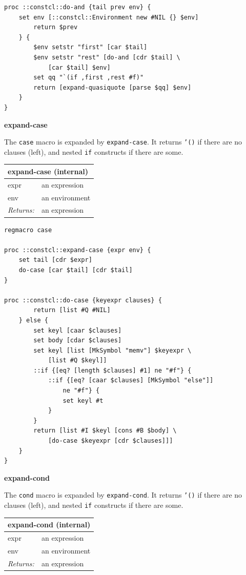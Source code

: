 \documentclass[twoside,9pt]{report}
\begin{document}
\noindent\makebox[\linewidth]{\rule{\linewidth}{0.4pt}}
\begin{lstlisting}
proc ::constcl::do-and {tail prev env} {
    set env [::constcl::Environment new #NIL {} $env]
        return $prev
    } {
        $env setstr "first" [car $tail]
        $env setstr "rest" [do-and [cdr $tail] \
            [car $tail] $env]
        set qq "`(if ,first ,rest #f)"
        return [expand-quasiquote [parse $qq] $env]
    }
}
\end{lstlisting}
\noindent\makebox[\linewidth]{\rule{\linewidth}{0.4pt}}

\textbf{expand-case}


The \texttt{case} macro is expanded by \texttt{expand-case}. It returns \texttt{'()} if there are no clauses (left), and nested \texttt{if} constructs if there are some.

\begin{tabular}{ |l l| }
\hline
\multicolumn{2}{|l|}{expand-case (internal)} \\
\hline
expr & an expression \\
env & an environment \\
\textit{Returns:} & an expression \\
\hline
\end{tabular}

\noindent\makebox[\linewidth]{\rule{\linewidth}{0.4pt}}
\begin{lstlisting}
regmacro case
 
proc ::constcl::expand-case {expr env} {
    set tail [cdr $expr]
    do-case [car $tail] [cdr $tail]
}
 
proc ::constcl::do-case {keyexpr clauses} {
        return [list #Q #NIL]
    } else {
        set keyl [caar $clauses]
        set body [cdar $clauses]
        set keyl [list [MkSymbol "memv"] $keyexpr \
            [list #Q $keyl]]
        ::if {[eq? [length $clauses] #1] ne "#f"} {
            ::if {[eq? [caar $clauses] [MkSymbol "else"]]
                ne "#f"} {
                set keyl #t
            }
        }
        return [list #I $keyl [cons #B $body] \
            [do-case $keyexpr [cdr $clauses]]]
    }
}
\end{lstlisting}
\noindent\makebox[\linewidth]{\rule{\linewidth}{0.4pt}}

\textbf{expand-cond}


The \texttt{cond} macro is expanded by \texttt{expand-cond}. It returns \texttt{'()} if there are no clauses (left), and nested \texttt{if} constructs if there are some.

\begin{tabular}{ |l l| }
\hline
\multicolumn{2}{|l|}{expand-cond (internal)} \\
\hline
expr & an expression \\
env & an environment \\
\textit{Returns:} & an expression \\
\hline
\end{tabular}
\end{document}
